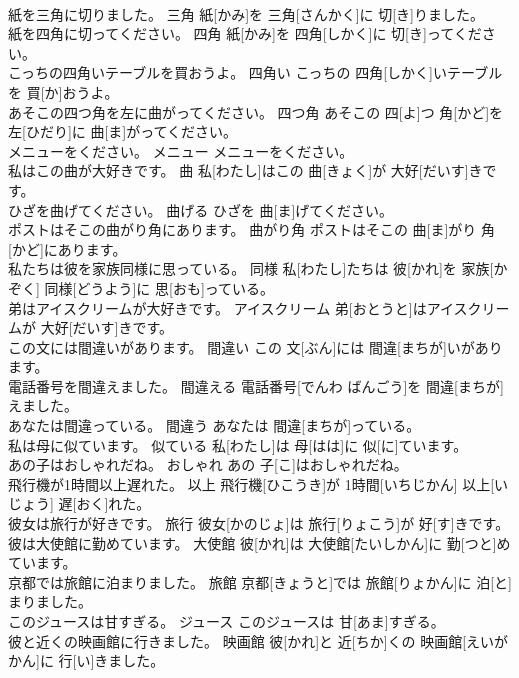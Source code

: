 \documentclass[8pt]{extreport}
\begin{document}
\begin{CJK}{UTF8}{min}
\\	紙を三角に切りました。	三角	紙[かみ]を 三角[さんかく]に 切[き]りました。	
\\	紙を四角に切ってください。	四角	紙[かみ]を 四角[しかく]に 切[き]ってください。	
\\	こっちの四角いテーブルを買おうよ。	四角い	こっちの 四角[しかく]いテーブルを 買[か]おうよ。	
\\	あそこの四つ角を左に曲がってください。	四つ角	あそこの 四[よ]つ 角[かど]を 左[ひだり]に 曲[ま]がってください。	
\\	メニューをください。	メニュー	メニューをください。	
\\	私はこの曲が大好きです。	曲	私[わたし]はこの 曲[きょく]が 大好[だいす]きです。	
\\	ひざを曲げてください。	曲げる	ひざを 曲[ま]げてください。	
\\	ポストはそこの曲がり角にあります。	曲がり角	ポストはそこの 曲[ま]がり 角[かど]にあります。	
\\	私たちは彼を家族同様に思っている。	同様	私[わたし]たちは 彼[かれ]を 家族[かぞく] 同様[どうよう]に 思[おも]っている。	
\\	弟はアイスクリームが大好きです。	アイスクリーム	弟[おとうと]はアイスクリームが 大好[だいす]きです。	
\\	この文には間違いがあります。	間違い	この 文[ぶん]には 間違[まちが]いがあります。	
\\	電話番号を間違えました。	間違える	電話番号[でんわ ばんごう]を 間違[まちが]えました。	
\\	あなたは間違っている。	間違う	あなたは 間違[まちが]っている。	
\\	私は母に似ています。	似ている	私[わたし]は 母[はは]に 似[に]ています。	
\\	あの子はおしゃれだね。	おしゃれ	あの 子[こ]はおしゃれだね。	
\\	飛行機が1時間以上遅れた。	以上	飛行機[ひこうき]が 1時間[いちじかん] 以上[いじょう] 遅[おく]れた。	
\\	彼女は旅行が好きです。	旅行	彼女[かのじょ]は 旅行[りょこう]が 好[す]きです。	
\\	彼は大使館に勤めています。	大使館	彼[かれ]は 大使館[たいしかん]に 勤[つと]めています。	
\\	京都では旅館に泊まりました。	旅館	京都[きょうと]では 旅館[りょかん]に 泊[と]まりました。	
\\	このジュースは甘すぎる。	ジュース	このジュースは 甘[あま]すぎる。	
\\	彼と近くの映画館に行きました。	映画館	彼[かれ]と 近[ちか]くの 映画館[えいがかん]に 行[い]きました。	

\end{CJK}
\end{document}
